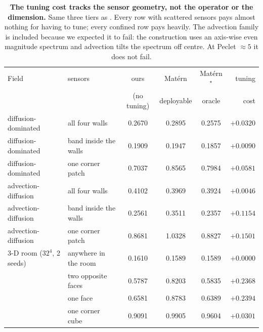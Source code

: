\begin{table}[t]
  \centering
  \caption{\textbf{The tuning cost tracks the sensor geometry, not the operator or the dimension.}  Same three tiers as .  Every row with scattered sensors pays almost nothing for having to tune; every confined row pays heavily.  The advection family is included because we expected it to fail: the construction uses an axis-wise even magnitude spectrum and advection tilts the spectrum off centre.  At Peclet ${\approx}5$ it does not fail.}
  \label{tab:replication}
  \small
  \begin{tabular}{llcccr}
    \toprule
    Field & sensors & ours & Mat\'ern & Mat\'ern$^\star$ & tuning \\
    & & (no tuning) & deployable & oracle & cost \\
    \midrule
    diffusion-dominated & all four walls & 0.2670 & 0.2895 & 0.2575 & $+0.0320$ \\
    diffusion-dominated & band inside the walls & 0.1909 & 0.1947 & 0.1857 & $+0.0090$ \\
    diffusion-dominated & one corner patch & 0.7037 & 0.8565 & 0.7984 & $+0.0581$ \\
    advection-diffusion & all four walls & 0.4102 & 0.3969 & 0.3924 & $+0.0046$ \\
    advection-diffusion & band inside the walls & 0.2561 & 0.3511 & 0.2357 & $+0.1154$ \\
    advection-diffusion & one corner patch & 0.8681 & 1.0328 & 0.8827 & $+0.1501$ \\
    \midrule
    3-D room ($32^4$, 2 seeds) & anywhere in the room & 0.1610 & 0.1589 & 0.1589 & $+0.0000$ \\
     & two opposite faces & 0.5787 & 0.8203 & 0.5835 & $+0.2368$ \\
     & one face & 0.6581 & 0.8783 & 0.6389 & $+0.2394$ \\
     & one corner cube & 0.9091 & 0.9905 & 0.9604 & $+0.0301$ \\
    \bottomrule
  \end{tabular}
\end{table}
